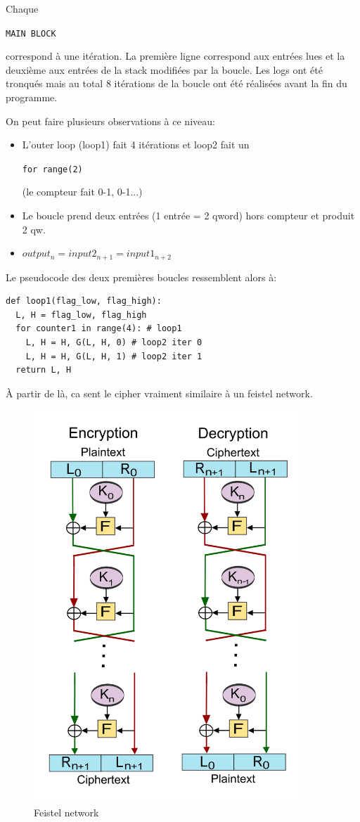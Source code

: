 \documentclass[14pt]{article}
\newcommand{\inlinebox}[2]{%
\colorbox{bg}{%
\parbox[b][0.6em]{\widthof{\texttt{#2}}}{\texttt{#2}}
}
}
\newcommand{\inlinepython}[1]{ \inlinebox{python}{#1} }
\newcommand{\inlinetext}[1]{ \inlinebox{text}{#1} }
\theoremstyle{definition}
\begin{document}
Chaque \inlinetext{MAIN BLOCK} correspond à une itération.
La première ligne correspond aux entrées lues et la deuxième aux entrées de la stack modifiées par la boucle.
Les logs ont été tronqués mais au total 8 itérations de la boucle ont été réalisées avant la fin du programme.

On peut faire plusieurs observations à ce niveau:
\begin{itemize}
  \item L'outer loop (loop1) fait 4 itérations et loop2 fait un \inlinepython{for range(2)} (le compteur fait 0-1, 0-1...)
  \item Le boucle prend deux entrées (1 entrée = 2 qword) hors compteur et produit 2 qw.
  \item $output_n = input2_{n+1} = input1_{n+2}$
\end{itemize}


Le pseudocode des deux premières boucles ressemblent alors à:
\begin{verbatim}
def loop1(flag_low, flag_high):
  L, H = flag_low, flag_high
  for counter1 in range(4): # loop1
    L, H = H, G(L, H, 0) # loop2 iter 0
    L, H = H, G(L, H, 1) # loop2 iter 1
  return L, H
\end{verbatim}

À partir de là, ca sent le cipher vraiment similaire à un feistel network.
\begin{figure}[H]
\centering
\includegraphics[width=0.9\textwidth]{./screenshots/800px-Feistel_cipher_diagram_en.svg.png}
  \caption{Feistel network}
  \label{fig:feistel}
\end{figure}
\end{document}
